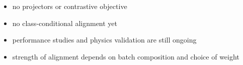 \begin{frame}[plain]

  \vspace{15mm}
  \begin{itemize}\tightlist
    \item no projectors or contrastive objective
    \item no class-conditional alignment yet
    \item performance studies and physics validation are still ongoing
    \item strength of alignment depends on batch composition and choice of weight
  \end{itemize}

  \slideheaderfooter
\end{frame}
